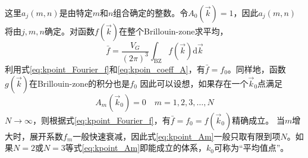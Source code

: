 这里$a_j(m,n)$是由特定$m$和$n$组合确定的整数。令$A_0(\vec k)=1$，因此$a_j(m,n)$将由$j,m,n$确定。对函数$f(\vec k)$在整个\textrm{Brillouin-zone}求平均，
\begin{equation}
	\bar f=\dfrac{V_G}{(2\pi)^3}\int_{\mathrm{BZ}}f(\vec k)\mathrm{d}\vec k
	\label{eq:kpoint_int}
\end{equation}
利用式\eqref{eq:kpoint_Fourier_f}和\eqref{eq:kpoin_coeff_A}，有$\bar f=f_0$。同样地，函数$g(\vec k)$在\textrm{Brillouin-zone}的积分也是$f_0$
因此可以设想，如果存在一个$\vec k_0$点满足
\begin{equation}
	A_m(\vec k_0)=0\quad m=1,2,3,\dots,N
	\label{eq:kpoint_Am}
\end{equation}
$N\rightarrow\infty$，则根据式\eqref{eq:kpoint_Fourier_f}，有$\bar f=f_0=f(\vec k_0)$精确成立。%
当$m$增大时，展开系数$f_m$一般快速衰减，因此式\eqref{eq:kpoint_Am}一般只取有限到项$N$。如果$N=2$或$N=3$等式\eqref{eq:kpoint_Am}即能成立的体系，$k_0$可称为“平均值点”。

